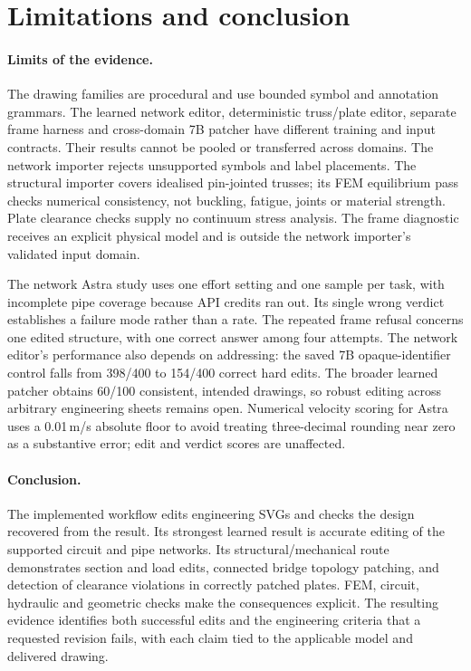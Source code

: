 \section{Limitations and conclusion}
\label{sec:conclusion}

\paragraph{Limits of the evidence.} The drawing families are procedural and use bounded symbol and
annotation grammars. The learned network editor, deterministic truss/plate editor, separate frame
harness and cross-domain 7B patcher have different training and input contracts. Their results cannot
be pooled or transferred across domains. The network importer rejects unsupported symbols and label
placements. The structural importer covers idealised pin-jointed trusses; its FEM equilibrium pass
checks numerical consistency, not buckling, fatigue, joints or material strength. Plate clearance
checks supply no continuum stress analysis. The frame diagnostic receives an explicit physical model
and is outside the network importer's validated input domain.

The network Astra study uses one effort setting and one sample per task, with incomplete pipe coverage
because API credits ran out. Its single wrong verdict establishes a failure mode rather than a rate.
The repeated frame refusal concerns one edited structure, with one correct answer among four attempts.
The network editor's performance also depends on addressing: the saved 7B opaque-identifier control
falls from 398/400 to 154/400 correct hard edits. The broader learned patcher obtains 60/100 consistent,
intended drawings, so robust editing across arbitrary engineering sheets remains open. Numerical
velocity scoring for Astra uses a 0.01\,m/s absolute floor to avoid treating three-decimal rounding
near zero as a substantive error; edit and verdict scores are unaffected.

\paragraph{Conclusion.} The implemented workflow edits engineering SVGs and checks the design recovered
from the result. Its strongest learned result is accurate editing of the supported circuit and pipe
networks. Its structural/mechanical route demonstrates section and load edits, connected bridge
topology patching, and detection of clearance violations in correctly patched plates. FEM, circuit,
hydraulic and geometric checks make the consequences explicit. The resulting evidence identifies
both successful edits and the engineering criteria that a requested revision fails, with each claim
tied to the applicable model and delivered drawing.
